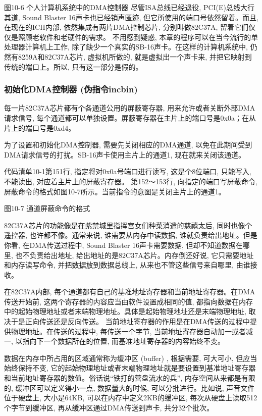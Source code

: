 \documentclass[12pt]{article}
\begin{document}
\begin{CJK}{UTF8}{gbsn}
图10-6  个人计算机系统中的DMA控制器
尽管ISA总线已经退役, PCI(E)总线大行其道, Sound Blaster 16声卡也已经销声匿迹, 但它所使用的端口号依然留着。而且, 在现在的ICH内部, 依然集成有两片DMA控制芯片, 分别叫做82C37A, 留着它们仅仅是照顾老软件和老硬件的需求。
不用感到疑惑, 本章的程序可以在当今流行的单处理器计算机上工作, 除了缺少一个真实的SB-16声卡。在这样的计算机系统中, 仍然有8259A和82C37A芯片, 虚拟机所做的, 就是虚拟出一个声卡来, 并把它映射到传统的端口上。所以, 只有这一部分是假的。

\subsubsection{初始化DMA控制器 (伪指令incbin) }
每一片82C37A芯片都有个各通道公用的屏蔽寄存器, 用来允许或者关断外部DMA请求信号, 每个通道都可以单独设置。屏蔽寄存器在主片上的端口号是0x0a；在从片上的端口号是0xd4。

为了设置和初始化DMA控制器, 需要先关闭相应的DMA通道, 以免在此期间受到DMA请求信号的打扰。SB-16声卡使用主片上的通道1, 现在就来关闭该通道。

代码清单10-1第151行, 指定将对0x0a号端口进行读写, 这是个8位端口, 只能写入, 不能读出, 对应着主片上的屏蔽寄存器。
第152～153行, 向指定的端口写屏蔽命令, 屏蔽命令的格式如图10-7所示。当前指令的意图是关闭主片上的通道1。
 
图10-7  通道屏蔽命令的格式

82C37A芯片的功能像是在紫禁城里指挥宫女们种菜消遣的慈禧太后, 同时也像个遥控器, 也许都不像。通常来说, 谁需要从内存中读数据, 谁就负责给出地址。但是你看, 在DMA传送过程中, Sound Blaster 16声卡需要数据, 但却不知道数据在哪里, 也不负责给出地址, 给出地址的是82C37A芯片。内存倒还好说, 它只需要地址和内存读写命令, 并把数据放到数据总线上, 从来也不管这些信号来自哪里, 由谁接收。

在82C37A内部, 每个通道都有自己的基准地址寄存器和当前地址寄存器。在DMA传送开始前, 这两个寄存器的内容应当由软件设置成相同的值, 都指向数据在内存中的起始物理地址或者末端物理地址。具体是起始物理地址还是末端物理地址, 取决于是正向传送还是反向传送。
当前地址寄存器的作用是在DMA传送的过程中提供物理地址。在传送的过程中, 每传送一个字节, 当前地址寄存器自动加一或者减一, 以指向下一个数据所在的位置, 而基准地址寄存器的内容始终不变。

数据在内存中所占用的区域通常称为缓冲区 (buffer) , 根据需要, 可大可小, 但应当始终保持不变, 它的起始物理地址或者末端物理地址就是要设置到基准地址寄存器和当前地址寄存器的数值。俗话说“铁打的营盘流水的兵”, 内存空间从来都是有限的, 缓冲区可以定义得小一点, 数据量大的时候, 可以分批进行。比如说, 声音文件位于硬盘上, 大小是64KB, 可以在内存中定义2KB的缓冲区, 每次从硬盘上读取512个字节到缓冲区, 再从缓冲区通过DMA传送到声卡, 共分32个批次。


\end{CJK}
\end{document}

